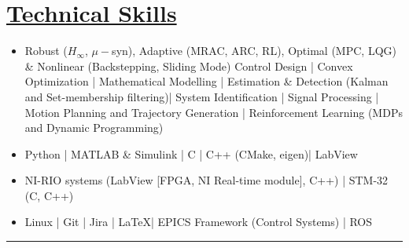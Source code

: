\section*{\underline{Technical Skills}}
\begin{itemize}
        \item[\itbf{Control and Estimation:}] Robust ($H_\infty$, $\mu-$syn), Adaptive (MRAC, ARC, RL), Optimal (MPC, LQG) \& Nonlinear (Backstepping, Sliding Mode) Control Design |
        Convex Optimization | Mathematical Modelling |
        Estimation \& Detection (Kalman and Set-membership filtering)|
        System Identification | Signal Processing |
        Motion Planning and Trajectory Generation |
        Reinforcement Learning (MDPs and Dynamic Programming)
        \item[\itbf{Programming:}] Python | MATLAB \& Simulink | C | C++ (CMake, eigen)| LabView
        \item[\itbf{Embedded Systems:}] NI-RIO systems (LabView [FPGA, NI Real-time module], C++) | STM-32 (C, C++)
        \item[\itbf{OS \& Tools:}] Linux | Git | Jira | \LaTeX | EPICS Framework (Control Systems) | ROS
\end{itemize}
\noindent\rule{\textwidth}{0.4pt}
